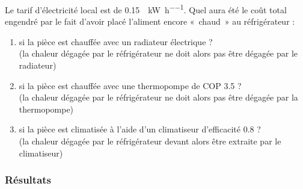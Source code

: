 	Le tarif d’électricité local est de \SI[per-mode = symbol]{0,15}{\euroo\per\kilo\watt\per\hour}. Quel aura été le coût total engendré par le fait d’avoir placé l’aliment encore «~chaud~» au réfrigérateur :
		
	\begin{enumerate}
		\item si la pièce est chauffée avec un radiateur électrique ? \\
			(la chaleur dégagée par le réfrigérateur ne doit alors pas être dégagée par le radiateur)
		\item si la pièce est chauffée avec une thermopompe de COP \num{3,5} ?	\\ 
			(la chaleur dégagée par le réfrigérateur ne doit alors pas être dégagée par la thermopompe)
		\item si la pièce est climatisée à l’aide d’un climatiseur d’efficacité \num{0,8} ?\\
			(la chaleur dégagée par le réfrigérateur devant alors être extraite par le climatiseur)
	\end{enumerate}

\exercisesolutionpage
\subsubsection*{Résultats}
	\linktosolutionsblurb

